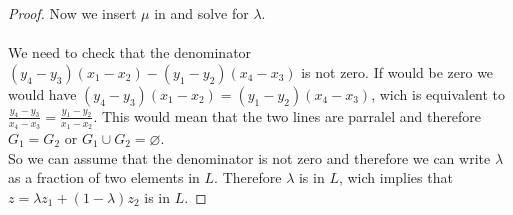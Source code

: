 \begin{proof}
    Now we insert $\mu$ in  and solve for $\lambda$.\\
    \\
    We need to check that the denominator $(y_4-y_3)(x_1 - x_2)- (y_1 - y_2)(x_4-x_3)$ is not zero.
    If would be zero we would have $(y_4-y_3)(x_1 - x_2) = (y_1 - y_2)(x_4-x_3)$, wich is equivalent to $\frac{y_4-y_3}{x_4-x_3} = \frac{y_1 - y_2}{x_1 - x_2}$. This would mean that the two lines are parralel and therefore $G_1 = G_2$ or $G_1 \cup G_2 = \varnothing$.\\
    So we can assume that the denominator is not zero and therefore we can write $\lambda$ as a fraction of two elements in $L$. Therefore $\lambda$ is in $L$, wich implies that $z = \lambda z_1 + (1-\lambda)z_2$ is in $L$.

\end{proof}

